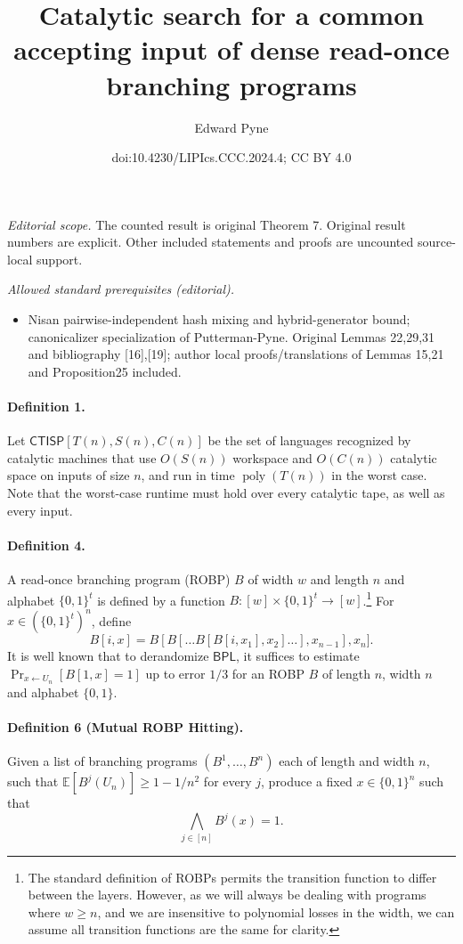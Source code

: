 \documentclass[10pt,a4paper]{article}
\title{Catalytic search for a common accepting input of dense read-once branching programs}
\author{Edward Pyne}
\date{doi:10.4230/LIPIcs.CCC.2024.4; CC BY 4.0}
\begin{document}
\maketitle
\noindent\textit{Editorial scope.} The counted result is original Theorem 7. Original result numbers are explicit. Other included statements and proofs are uncounted source-local support.\par\medskip
\noindent\textit{Allowed standard prerequisites (editorial).}\begin{itemize}
\item Nisan pairwise-independent hash mixing and hybrid-generator bound; canonicalizer specialization of Putterman-Pyne. Original Lemmas 22,29,31 and bibliography [16],[19]; author local proofs/translations of Lemmas 15,21 and Proposition25 included.
\end{itemize}\medskip
\paragraph{Definition 1.} Let $\mathsf{CTISP}[T(n),S(n),C(n)]$ be the set of languages recognized by catalytic machines that use $O(S(n))$ workspace and $O(C(n))$ catalytic space on inputs of size $n$, and run in time $\operatorname{poly}(T(n))$ in the worst case.
Note that the worst-case runtime must hold over every catalytic tape, as well as every input.
\paragraph{Definition 4.} A read-once branching program (ROBP) $B$ of width $w$ and length $n$ and alphabet $\{0,1\}^t$ is defined by a function $B:[w]\times\{0,1\}^t\to[w]$.\footnote{The standard definition of ROBPs permits the transition function to differ between the layers. However, as we will always be dealing with programs where $w\geq n$, and we are insensitive to polynomial losses in the width, we can assume all transition functions are the same for clarity.} For $x\in(\{0,1\}^t)^n$, define
\[B[i,x]=B[B[\ldots B[B[i,x_1],x_2]\ldots],x_{n-1}],x_n].\]
It is well known that to derandomize $\mathsf{BPL}$, it suffices to estimate $\Pr_{x\leftarrow U_n}[B[1,x]=1]$ up to error $1/3$ for an ROBP $B$ of length $n$, width $n$ and alphabet $\{0,1\}$.
\paragraph{Definition 6 (Mutual ROBP Hitting).} Given a list of branching programs $(B^1,\ldots,B^n)$ each of length and width $n$, such that $\mathbb{E}[B^j(U_n)]\geq1-1/n^2$ for every $j$, produce a fixed $x\in\{0,1\}^n$ such that
\[\bigwedge_{j\in[n]}B^j(x)=1.\]
\end{document}
